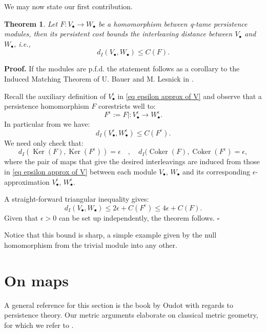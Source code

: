 \documentclass[11pt]{article}
\newtheorem{thm}{Theorem}[section]
\newenvironment{pf}[1][Proof]{\noindent\textbf{#1.} }{ \hfill$\square$\medskip}
\DeclareMathOperator{\Coker}{Coker}
\DeclareMathOperator{\Ker}{Ker}
\newcommand{\bu}{_{\bullet}}
\begin{document}
We may now state our first contribution. 
\begin{thm}\label{thm lower bound}
Let $F:V\bu\to W\bu$ be a homomorphism between q-tame persistence modules, then its persistent cost bounds the interleaving distance between $V\bu$ and $W\bu$, i.e.,
\[ d_I(V\bu,W\bu)\leq C(F). \]
\end{thm}
\begin{pf}
If the modules are p.f.d. the statement follows as a corollary to the Induced Matching Theorem of U. Bauer and M. Lesnick in \cite{bauer2015induced}. 

Recall the auxiliary definition of $V^{\epsilon}\bu$ 
in \eqref{eq epsilon approx of V} and observe that a persistence homomorphism $F$ corestricts well to:
\[F^{\epsilon}:=F|: V^{\epsilon}\bu\to W^{\epsilon}\bu . \]
In particular from \cite{bauer2015induced} we have:
 \[ d_I( V^{\epsilon}\bu, W^{\epsilon}\bu) \leq C(F^{\epsilon}).  \]
We need only check that:
\[  d_I(\Ker(F), \Ker(F^{\epsilon}))= \epsilon  \quad,\quad   d_I(\Coker(F), \Coker(F^{\epsilon})= \epsilon,\]
where the pair of maps that give the desired interleavings are induced from those in \eqref{eq epsilon approx of V} between each module $V\bu$, $W\bu$ and its corresponding $\epsilon$-approximation
$V^{\epsilon}\bu$, $W^{\epsilon}\bu$.

A straight-forward triangular inequality gives:
 \[ d_I( V\bu, W\bu) \leq 2\epsilon + C(F^{\epsilon})\leq 4 \epsilon + C(F).  \]
Given that $\epsilon>0$ can be set up independently, the theorem follows.
\end{pf}

Notice that this bound is sharp, a simple example given by the null homomorphism from the trivial module into any other.

\section{On maps}
 A general reference for this section is the book by Oudot \cite{oudot2015persistence} with regards to persistence theory. Our metric arguments elaborate on classical metric geometry, for which we refer to \cite{burago2001metricgeometry}.
\end{document}

